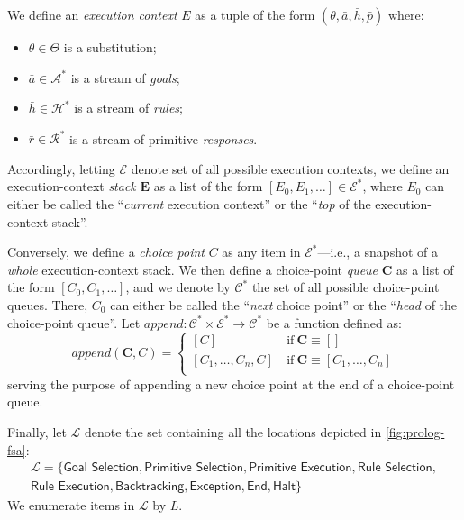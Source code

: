 \documentclass{article}
\newcommand{\stateStyle}[1]{\textsf{#1}}
\newcommand{\state}[1]{\stateStyle{#1}}
\newcommand{\stream}[1]{\bar{#1}}
\newcommand{\vect}[1]{\mathbf{#1}}
\newcommand{\notableset}[1]{\mathcal{#1}}
\newcommand{\f}[1]{\mathit{#1}}
\newcommand{\fx}[2]{\f{#1}(#2)}
\begin{document}
We define an \emph{execution context} $E$ as a tuple of the form $\left( \theta, \stream{a}, \stream{h}, \stream{p} \right)$ where:
%
\begin{itemize}
    \item $\theta \in \Theta$ is a substitution;
    \item $\stream{a} \in \notableset{A}^*$ is a stream of \emph{goals};
    \item $\stream{h} \in \notableset{H}^*$ is a stream of \emph{rules};
    \item $\stream{r} \in \notableset{R}^*$ is a stream of primitive \emph{responses}.
\end{itemize}
%
Accordingly, letting $\notableset{E}$ denote set of all possible execution contexts, we define an execution-context \emph{stack} $\vect{E}$ as a list of the form $[E_0, E_1, \ldots] \in \notableset{E}^*$, where $E_0$ can either be called the ``\emph{current} execution context'' or the ``\emph{top} of the execution-context stack''.

Conversely, we define a \emph{choice point} $C$ as any item in $\notableset{E}^*$---i.e., a snapshot of a \emph{whole} execution-context stack.
%
We then define a choice-point \emph{queue} $\vect{C}$ as a list of the form $[C_0, C_1, \ldots]$, and we denote by $\notableset{C}^*$ the set of all possible choice-point queues.
%
There, $C_0$ can either be called the ``\emph{next} choice point'' or the ``\emph{head} of the choice-point queue''.
%
Let $ \f{append} : \notableset{C}^* \times \notableset{E}^* \rightarrow \notableset{C}^* $ be a function defined as:
%
\[
    \fx{append}{\vect{C}, C} = \begin{cases}
        [C] & \ \text{if}\ \vect{C} \equiv [] \\
        [C_1, \ldots, C_n, C] & \ \text{if}\ \vect{C} \equiv [C_1, \ldots, C_n] \\
    \end{cases}    
\]
%
serving the purpose of appending a new choice point at the end of a choice-point queue.

Finally, let $\notableset{L}$ denote the set containing all the locations depicted in \cref{fig:prolog-fsa}:
%
\begin{multline*} 
\notableset{L} = \{ \state{Goal Selection}, \state{Primitive Selection}, \state{Primitive Execution}, \state{Rule Selection},
\\
\state{Rule Execution}, \state{Backtracking}, \state{Exception}, \state{End}, \state{Halt} \}
\end{multline*}
%
We enumerate items in $\notableset{L}$ by $L$.
\end{document}
